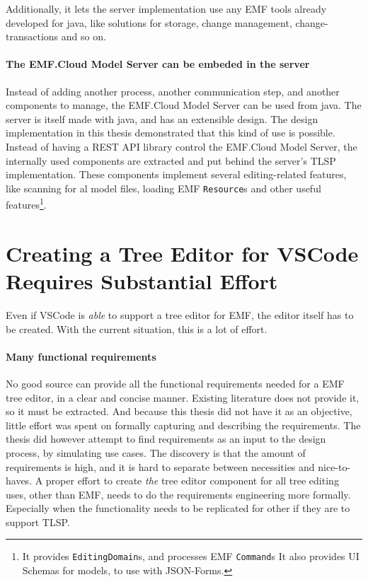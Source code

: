 Additionally, it lets the server implementation use any \acrshort{EMF} tools already developed for java, like solutions for storage, change management, change-transactions and so on.

\paragraph{The EMF.Cloud Model Server can be embeded in the server}
Instead of adding another process, another communication step, and another components to manage, the EMF.Cloud Model Server can be used from java.
The server is itself made with java, and has an extensible design.
The design implementation in this thesis demonstrated that this kind of use is possible.
Instead of having a \gls{REST} \acrshort{API} library control the EMF.Cloud Model Server, the internally used components are extracted and put behind the server's \acrshort{TLSP} implementation.
These components implement several editing-related features, like scanning for al model files, loading \acrshort{EMF} \texttt{Resource}s and other useful features\footnote{It provides \texttt{EditingDomain}s, and processes \acrshort{EMF} \texttt{Command}s It also provides UI Schemas for models, to use with JSON-Forms.}.


\section{Creating a Tree Editor for VSCode Requires Substantial Effort}

Even if \gls{VSCode} is \textit{able} to support a tree editor for \acrshort{EMF}, the editor itself has to be created.
With the current situation, this is a lot of effort.

\paragraph{Many functional requirements}
No good source can provide all the functional requirements needed for a \acrshort{EMF} tree editor, in a clear and concise manner.
Existing literature does not provide it, so it must be extracted.
And because this thesis did not have it as an objective, little effort was spent on formally capturing and describing the requirements.
The thesis did however attempt to find requirements as an input to the design process, by simulating use cases.
The discovery is that the amount of requirements is high, and it is hard to separate between necessities and nice-to-haves.
A proper effort to create \textit{the} tree editor component for all tree editing uses, other than \acrshort{EMF}, needs to do the requirements engineering more formally.
Especially when the functionality needs to be replicated for other  if they are to support \acrshort{TLSP}.

